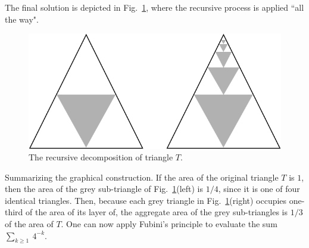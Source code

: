\begin{itemize}
The final solution is depicted in Fig.~\ref{Fig:Sum1over4cascade}, where the recursive process is applied ``all the way". 
\begin{figure}
\begin{center}
        \includegraphics[scale=0.3]{FiguresMaths/Sum1over4cascade}
        \caption{The recursive decomposition of triangle $T$.}
        \label{Fig:Sum1over4cascade}
\end{center}
\end{figure}
Summarizing  the graphical construction.  If the area of the original triangle $T$ is $1$, then 
the area of the grey sub-triangle of Fig.~\ref{Fig:Sum1over4cascade}(left) is $1/4$, since it is one of four identical triangles.  Then, because each grey triangle in Fig.~\ref{Fig:Sum1over4cascade}(right) occupies one-third of the area of its layer of, the aggregate area of the grey sub-triangles is $1/3$ of the area of $T$.  One can now apply Fubini's principle to evaluate the sum $\sum_{k \geq 1} \ 4^{-k}$.
\end{itemize}

